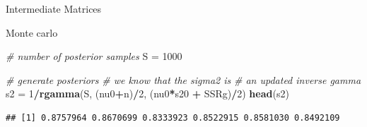 \documentclass[ignorenonframetext,]{beamer}
\newenvironment{Shaded}{\begin{snugshade}}{\end{snugshade}}
\newcommand{\KeywordTok}[1]{\textcolor[rgb]{0.13,0.29,0.53}{\textbf{#1}}}
\newcommand{\DataTypeTok}[1]{\textcolor[rgb]{0.13,0.29,0.53}{#1}}
\newcommand{\DecValTok}[1]{\textcolor[rgb]{0.00,0.00,0.81}{#1}}
\newcommand{\StringTok}[1]{\textcolor[rgb]{0.31,0.60,0.02}{#1}}
\newcommand{\CommentTok}[1]{\textcolor[rgb]{0.56,0.35,0.01}{\textit{#1}}}
\newcommand{\OperatorTok}[1]{\textcolor[rgb]{0.81,0.36,0.00}{\textbf{#1}}}
\newcommand{\NormalTok}[1]{#1}
\begin{document}
\begin{frame}[fragile]{Intermediate Matrices}

\begin{Shaded}
\end{Shaded}

\end{frame}

\begin{frame}[fragile]{Monte carlo}

\begin{Shaded}
\begin{Highlighting}[]
\CommentTok{# number of posterior samples}
\NormalTok{S =}\StringTok{ }\DecValTok{1000}

\CommentTok{# generate posteriors}
\CommentTok{# we know that the sigma2 is}
\CommentTok{# an updated inverse gamma}
\NormalTok{s2 =}\StringTok{ }\DecValTok{1}\OperatorTok{/}\KeywordTok{rgamma}\NormalTok{(S, (nu0}\OperatorTok{+}\NormalTok{n)}\OperatorTok{/}\DecValTok{2}\NormalTok{, (nu0}\OperatorTok{*}\NormalTok{s20 }\OperatorTok{+}\StringTok{ }\NormalTok{SSRg)}\OperatorTok{/}\DecValTok{2}\NormalTok{)}
\KeywordTok{head}\NormalTok{(s2)}
\end{Highlighting}
\end{Shaded}

\begin{verbatim}
## [1] 0.8757964 0.8670699 0.8333923 0.8522915 0.8581030 0.8492109
\end{verbatim}

\end{frame}
\end{document}
